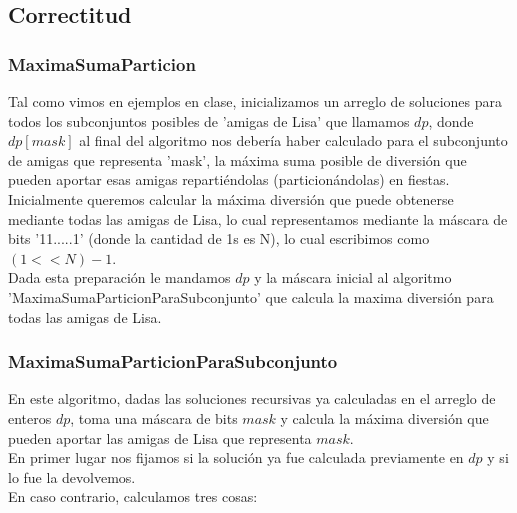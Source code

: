 \subsection{Correctitud}

\subsubsection{MaximaSumaParticion}
Tal como vimos en ejemplos en clase, inicializamos un arreglo de soluciones para todos los subconjuntos posibles de 'amigas de Lisa' que llamamos $dp$, donde $dp[mask]$ al final del algoritmo nos debería haber calculado para el subconjunto de amigas que representa 'mask', la máxima suma posible de diversión que pueden aportar esas amigas repartiéndolas (particionándolas) en fiestas. \\
Inicialmente queremos calcular la máxima diversión que puede obtenerse mediante todas las amigas de Lisa, lo cual representamos mediante la máscara de bits '11.....1' (donde la cantidad de 1s es N), lo cual escribimos como $(1<<N)-1$. \\
Dada esta preparación le mandamos $dp$ y la máscara inicial al algoritmo 'MaximaSumaParticionParaSubconjunto' que calcula la maxima diversión para todas las amigas de Lisa.

\subsubsection{MaximaSumaParticionParaSubconjunto}

En este algoritmo, dadas las soluciones recursivas ya calculadas en el arreglo de enteros $dp$, toma una máscara de bits $mask$ y calcula la máxima diversión que pueden aportar las amigas de Lisa que representa $mask$. \\
En primer lugar nos fijamos si la solución ya fue calculada previamente en $dp$ y si lo fue la devolvemos. \\
En caso contrario, calculamos tres cosas:

